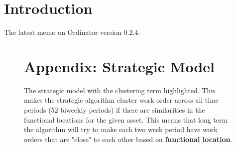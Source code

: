 \documentclass[11pt]{article}
\begin{document}
	
	\section{Introduction}
	The latest memo on Ordinator version 0.2.4.
	

	\newpage
	\begin{figure}
		\section{Appendix: Strategic Model}\label{sec:strategic-model}
		\strategicModel[clustering=true, beta=false, multiskill=true]
		\caption{The strategic model with the clustering term highlighted. This makes the
			strategic algorithm cluster work order across all time periods (52 biweekly periods)
			if there are similarities in the functional locations for the given asset. This means
			that long term the algorithm will try to make each two week period have work orders
			that are "close" to each other based on \textbf{functional location}.
		}
	\end{figure}
	
	\newpage

	
	
\end{document}
